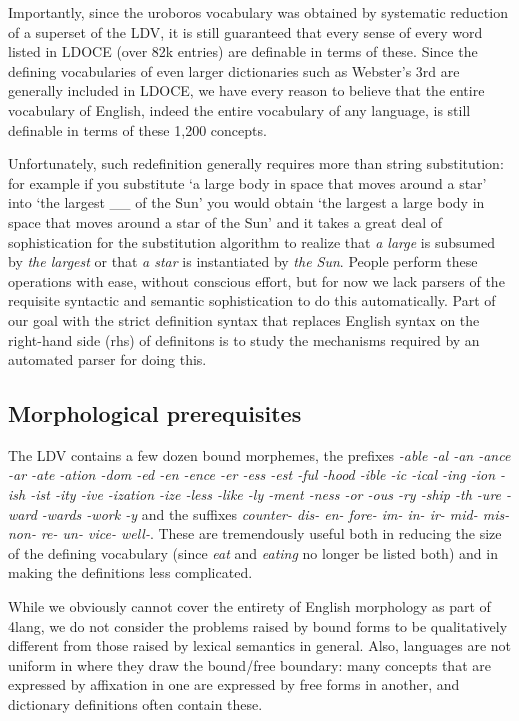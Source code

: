 \documentclass[11pt,bookmarks,bookmarksnumbered,naturalnames,plainpages=false,pdftex,colorlinks=true,urlcolor=blue,bookmarksdepth=subsection,plainpages=false]{paper}
\begin{document}
Importantly, since the uroboros vocabulary was obtained by systematic
reduction of a superset of the LDV, it is still guaranteed that every sense of
every word listed in LDOCE (over 82k entries) are definable in terms of
these. Since the defining vocabularies of even larger dictionaries such as
Webster's 3rd \citep{Merriam:1961} are generally included in LDOCE, we have
every reason to believe that the entire vocabulary of English, indeed the
entire vocabulary of any language, is still definable in terms of these 1,200
concepts. 

Unfortunately, such redefinition generally requires more than string
substitution: for example if you substitute `a large body in space that moves
around a star' into `the largest \_\_ of the Sun' you would obtain `the
largest a large body in space that moves around a star of the Sun' and it
takes a great deal of sophistication for the substitution algorithm to realize
that {\it a large} is subsumed by {\it the largest} or that {\it a star} is
instantiated by {\it the Sun}. People perform these operations with ease,
without conscious effort, but for now we lack parsers of the requisite
syntactic and semantic sophistication to do this automatically. Part of our
goal with the strict definition syntax that replaces English syntax on the
right-hand side (rhs) of definitons is to study the mechanisms required by an
automated parser for doing this. 

\subsection{Morphological prerequisites}

The LDV contains a few dozen bound morphemes, the prefixes {\it -able -al -an
  -ance -ar -ate -ation -dom -ed -en -ence -er -ess -est -ful -hood -ible -ic
  -ical -ing -ion -ish -ist -ity -ive -ization -ize -less -like -ly -ment
  -ness -or -ous -ry -ship -th -ure -ward -wards -work -y} and the suffixes
{\it counter- dis- en- fore- im- in- ir- mid- mis- non- re- un- vice- well-}.
These are tremendously useful both in reducing the size of the defining
vocabulary (since {\it eat} and {\it eating} no longer be listed both) and in
making the definitions less complicated. 

While we obviously cannot cover the entirety of English morphology as part of
4lang, we do not consider the problems raised by bound forms to be
qualitatively different from those raised by lexical semantics in
general. Also, languages are not uniform in where they draw the bound/free
boundary: many concepts that are expressed by affixation in one are expressed
by free forms in another, and dictionary definitions often contain these.
\end{document}
